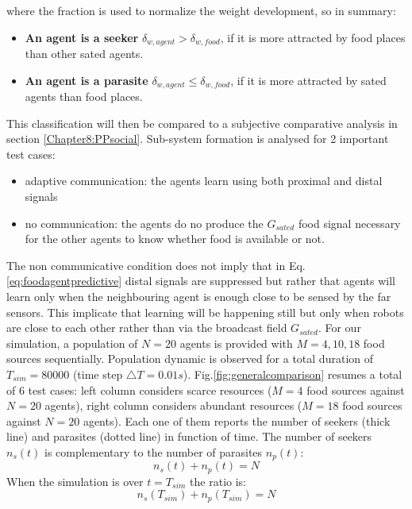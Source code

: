 where the fraction is used to normalize the weight development, so in summary:
\begin{itemize}
 \item \textbf{An agent is a seeker} $\delta_{w,agent} > \delta_{w,food}$, if it is more
attracted by food places than other sated agents.
\item \textbf{An agent is a parasite} $\delta_{w,agent}\leq \delta_{w,food}$, if it is
more attracted by sated agents than food places.
\end{itemize}
This classification will then be compared to a subjective comparative analysis in
section \ref{Chapter8:PPsocial}.
Sub-system formation is analysed for 2 important test cases:
\begin{itemize}
 \item adaptive communication: the agents learn using both proximal and distal signals
 \item no communication: the agents do no produce the $G_{sated}$ food signal necessary
for the other agents to know whether food is available or not.
\end{itemize}
The non communicative condition does not imply that in Eq. \ref{eq:foodagentpredictive} distal
signals are suppressed but rather that agents will learn only when the neighbouring agent
is enough close to be sensed by the far sensors.
This implicate that learning will be happening still but only when robots are close 
to each other rather than via the broadcast field  $G_{sated}$.
For our simulation, a population of $N=20$ agents is provided with $M=4,10,18$ food sources sequentially.
Population dynamic is observed for a total duration of  $T_{sim}=80000$ (time step $\triangle T=0.01 s$).
Fig.\ref{fig:generalcomparison} resumes a total of 6 test cases: left column considers scarce resources
 ($M=4$ food sources against $N=20$ agents), right column considers abundant resources ($M=18$ food sources against $N=20$ agents).
Each one of them reports the number of seekers (thick line) and parasites (dotted line) in function of time.
The number of seekers $n_{s}(t)$ is complementary to the number of parasites $n_{p}(t)$: 
\begin{equation}
n_{s}(t)+n_{p}(t)=N \label{eq:social:ratio} 
\end{equation}
When the simulation is over $t=T_{sim}$ the ratio is:
\begin{equation}
n_{s}(T_{sim})+n_{p}(T_{sim})=N \label{eq:social:ratiofin} 
\end{equation}

